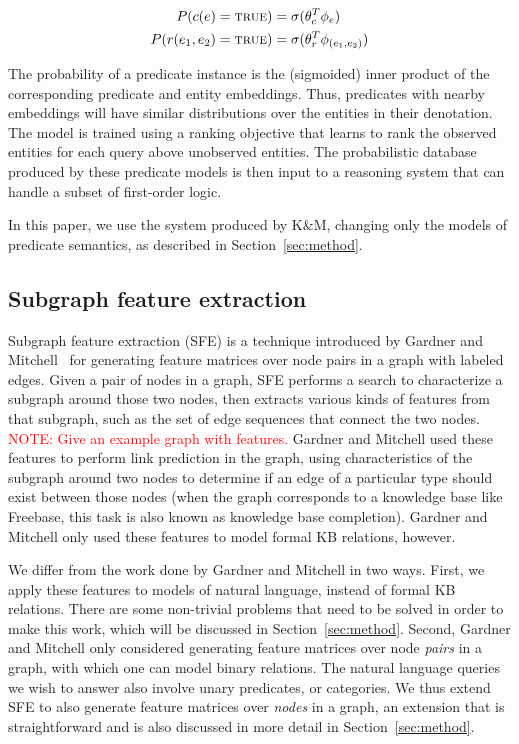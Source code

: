 \documentclass[11pt]{article}
\newcommand{\secref}[1]{Section~\ref{sec:#1}}
\newcommand{\mattnote}[1]{\textcolor{red}{NOTE: #1}}
\newcommand{\predicate}[1]{\ensuremath{\textsc{#1}}}
\newcommand{\true}[0]{\predicate{true}}
\begin{document}
\begin{align*}
  P(c(e) = \true{}) &= \sigma ( \theta_c^T \phi_e ) \\
  P(r(e_1, e_2) = \true{}) &= \sigma ( \theta_r^T \phi_{(e_1, e_2)} )
\end{align*}

The probability of a predicate instance is the (sigmoided) inner product of the
corresponding predicate and entity embeddings. Thus, predicates with nearby
embeddings will have similar distributions over the entities in their
denotation.  The model is trained using a ranking objective that learns to rank
the observed entities for each query above unobserved entities.  The
probabilistic database produced by these predicate models is then input to a
reasoning system that can handle a subset of first-order logic.

In this paper, we use the system produced by K\&M, changing only the models of
predicate semantics, as described in \secref{method}.

\subsection{Subgraph feature extraction}

Subgraph feature extraction (SFE) is a technique introduced by Gardner and
Mitchell~ for generating feature matrices over node
pairs in a graph with labeled edges.  Given a pair of nodes in a graph, SFE
performs a search to characterize a subgraph around those two nodes, then
extracts various kinds of features from that subgraph, such as the set of edge
sequences that connect the two nodes.  \mattnote{Give an example graph with
features.}  Gardner and Mitchell used these features to perform link
prediction in the graph, using characteristics of the subgraph around two nodes
to determine if an edge of a particular type should exist between those nodes
(when the graph corresponds to a knowledge base like Freebase, this task is
also known as knowledge base completion). Gardner and Mitchell only used these
features to model formal KB relations, however.

We differ from the work done by Gardner and Mitchell in two ways.  First, we
apply these features to models of natural language, instead of formal KB
relations.  There are some non-trivial problems that need to be solved in order
to make this work, which will be discussed in \secref{method}.  Second, Gardner
and Mitchell only considered generating feature matrices over node \emph{pairs}
in a graph, with which one can model binary relations.  The natural language
queries we wish to answer also involve unary predicates, or categories.  We
thus extend SFE to also generate feature matrices over \emph{nodes} in a graph,
an extension that is straightforward and is also discussed in more detail in
\secref{method}.
\end{document}
